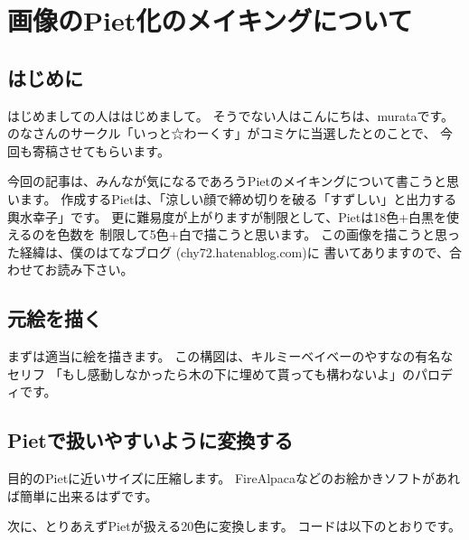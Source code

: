 \chapter[画像のPiet化のメイキングについて]{画像のPiet化のメイキングについて}

\author{murata}

\section{はじめに}

はじめましての人ははじめまして。 そうでない人はこんにちは、murataです。
のなさんのサークル「いっと☆わーくす」がコミケに当選したとのことで、
今回も寄稿させてもらいます。

今回の記事は、みんなが気になるであろうPietのメイキングについて書こうと思います。
作成するPietは、「涼しい顔で締め切りを破る「すずしい」と出力する輿水幸子」です。
更に難易度が上がりますが制限として、Pietは18色+白黒を使えるのを色数を
制限して5色+白で描こうと思います。
この画像を描こうと思った経緯は、僕のはてなブログ
(chy72.hatenablog.com)に 書いてありますので、合わせてお読み下さい。

\section{元絵を描く}


まずは適当に絵を描きます。
この構図は、キルミーベイベーのやすなの有名なセリフ
「もし感動しなかったら木の下に埋めて貰っても構わないよ」のパロディです。

\section{Pietで扱いやすいように変換する}

目的のPietに近いサイズに圧縮します。
FireAlpacaなどのお絵かきソフトがあれば簡単に出来るはずです。


次に、とりあえずPietが扱える20色に変換します。
コードは以下のとおりです。

